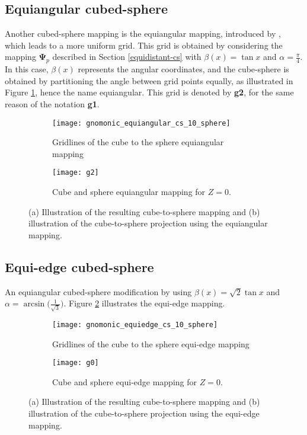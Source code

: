 \subsection{Equiangular cubed-sphere}
\label{cs-equiangular}
Another cubed-sphere mapping is the equiangular mapping, 
introduced by \citet{ronchi:1996}, which leads to a more uniform grid.
This grid is obtained by considering the mapping $\boldsymbol{\Psi}_p$ described in Section \ref{equidistant-cs}
with $\beta(x) = \tan{x}$ and $\alpha=\frac{\pi}{4}$.
In this case, $\beta(x)$ represents the angular coordinates, and the cube-sphere is obtained by partitioning the angle between
grid points equally, as illustrated in Figure \ref{chp-cs-equiangular}, hence the name equiangular.
This grid is denoted by \textbf{g2}, for the same reason of the notation \textbf{g1}.
\begin{figure}[!htb]
	\centering
	\begin{subfigure}{0.42\textwidth}
		\texttt{[image: gnomonic\_equiangular\_cs\_10\_sphere]}
		\caption{Gridlines of the cube to the sphere equiangular mapping}
	\end{subfigure}
	\begin{subfigure}{0.42\textwidth}
		\centering
		\texttt{[image: g2]}
		\caption{Cube and sphere equiangular mapping for $Z=0$.}
	\end{subfigure}
	\caption{(a) Illustration of the resulting cube-to-sphere mapping and (b) illustration of the cube-to-sphere projection using the equiangular mapping.\label{chp-cs-equiangular}}
\end{figure}

\subsection{Equi-edge cubed-sphere}
\label{cs-equiedge}
An equiangular cubed-sphere modification 
\citet{chen:2021} by using $\beta(x) = \sqrt{2}\tan{x}$ and
$\alpha=\arcsin{\big(\frac{1}{\sqrt{3}}\big)}$.
Figure \ref{chp-cs-equiedge} illustrates the equi-edge mapping.
\begin{figure}[!htb]
	\centering
	\begin{subfigure}{0.42\textwidth}
		\texttt{[image: gnomonic\_equiedge\_cs\_10\_sphere]}
		\caption{Gridlines of the cube to the sphere equi-edge mapping}
	\end{subfigure}
	\begin{subfigure}{0.42\textwidth}
		\centering
		\texttt{[image: g0]}
		\caption{Cube and sphere equi-edge mapping for $Z=0$.}
	\end{subfigure}
	\caption{(a) Illustration of the resulting cube-to-sphere mapping and (b) illustration of the cube-to-sphere projection using the equi-edge mapping.\label{chp-cs-equiedge}}
\end{figure}

